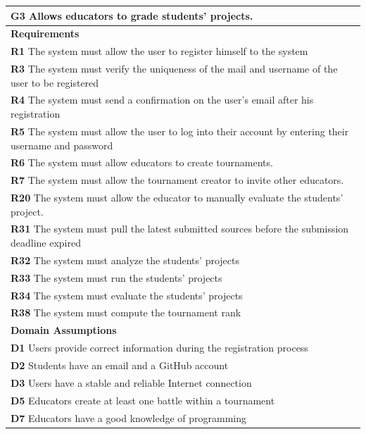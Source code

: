 \begin{table}[H]
    \begin{tabularx}{\textwidth}{X}
        \toprule
        \textbf{G3} Allows educators to grade students' projects.                                                    \\ \midrule
        \textbf{Requirements}                                                                                                        \\ \midrule
        \textbf{R1} The system must allow the user to register himself to the system                                                     \\
        \textbf{R3} The system must verify the uniqueness of the mail and username of the user to be registered                                       \\ 
        \textbf{R4} The system must send a confirmation on the user's email after his registration                         \\
        \textbf{R5} The system must allow the user to log into their account by entering their username and password           \\
        \textbf{R6} The system must allow educators to create tournaments.              \\
        \textbf{R7} The system must allow the tournament creator to invite other educators.         \\  
        \textbf{R20} The system must allow the educator to manually evaluate the students' project.          \\ 
        \textbf{R31} The system must pull the latest submitted sources before the submission deadline expired     \\ 
        \textbf{R32} The system must analyze the students' projects      \\ 
        \textbf{R33} The system must run the students' projects      \\
        \textbf{R34} The system must evaluate the students' projects     \\ 
        \textbf{R38} The system must compute the tournament rank                 \\ 
        \midrule
        \textbf{Domain Assumptions}                                                                                                  \\ \midrule
        \textbf{D1} Users provide correct information during the registration process \\           
        \textbf{D2} Students have an email and a GitHub account     \\
        \textbf{D3} Users have a stable and reliable Internet connection \\
        \textbf{D5} Educators create at least one battle within a tournament        \\
        \textbf{D7} Educators have a good knowledge of programming      \\
        \bottomrule
    \end{tabularx}
\end{table}

